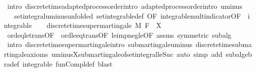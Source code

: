 \begin{isabellebody}
\ {\isacharparenleft}{\kern0pt}intro\ discrete{\isacharunderscore}{\kern0pt}time{\isacharunderscore}{\kern0pt}adapted{\isacharunderscore}{\kern0pt}process{\isacharunderscore}{\kern0pt}order{\isachardot}{\kern0pt}intro\ adapted{\isacharunderscore}{\kern0pt}process{\isacharunderscore}{\kern0pt}order{\isachardot}{\kern0pt}intro\ uminus{\isacharparenright}{\kern0pt}\isanewline
\ \ \isamarkupfalse%
\ {\isacharasterisk}{\kern0pt}\ {\isacharequal}{\kern0pt}\ set{\isacharunderscore}{\kern0pt}integral{\isacharunderscore}{\kern0pt}uminus{\isacharbrackleft}{\kern0pt}unfolded\ set{\isacharunderscore}{\kern0pt}integrable{\isacharunderscore}{\kern0pt}def{\isacharcomma}{\kern0pt}\ OF\ integrable{\isacharunderscore}{\kern0pt}mult{\isacharunderscore}{\kern0pt}indicator{\isacharbrackleft}{\kern0pt}OF\ {\isacharunderscore}{\kern0pt}\ integrable{\isacharbrackright}{\kern0pt}{\isacharbrackright}{\kern0pt}\isanewline
\ \ \isamarkupfalse%
\ {\isachardoublequoteopen}discrete{\isacharunderscore}{\kern0pt}time{\isacharunderscore}{\kern0pt}supermartingale\ M\ F\ {\isacharparenleft}{\kern0pt}{\isacharminus}{\kern0pt}{\isacharparenleft}{\kern0pt}{\isacharminus}{\kern0pt}\ X{\isacharparenright}{\kern0pt}{\isacharparenright}{\kern0pt}{\isachardoublequoteclose}\ \isamarkupfalse%
\ ord{\isacharunderscore}{\kern0pt}eq{\isacharunderscore}{\kern0pt}le{\isacharunderscore}{\kern0pt}trans{\isacharbrackleft}{\kern0pt}OF\ {\isacharasterisk}{\kern0pt}\ ord{\isacharunderscore}{\kern0pt}le{\isacharunderscore}{\kern0pt}eq{\isacharunderscore}{\kern0pt}trans{\isacharbrackleft}{\kern0pt}OF\ le{\isacharunderscore}{\kern0pt}imp{\isacharunderscore}{\kern0pt}neg{\isacharunderscore}{\kern0pt}le{\isacharbrackleft}{\kern0pt}OF\ assms{\isacharparenleft}{\kern0pt}{}{\isacharparenright}{\kern0pt}{\isacharbrackright}{\kern0pt}\ {\isacharasterisk}{\kern0pt}{\isacharbrackleft}{\kern0pt}symmetric{\isacharbrackright}{\kern0pt}{\isacharbrackright}{\kern0pt}{\isacharbrackright}{\kern0pt}\ subalg\isanewline
\ \ \ \ \isamarkupfalse%
\ {\isacharparenleft}{\kern0pt}intro\ discrete{\isacharunderscore}{\kern0pt}time{\isacharunderscore}{\kern0pt}supermartingale{\isachardot}{\kern0pt}intro\ submartingale{\isachardot}{\kern0pt}uminus\ discrete{\isacharunderscore}{\kern0pt}time{\isacharunderscore}{\kern0pt}submartingale{\isachardot}{\kern0pt}axioms\ uminus{\isacharunderscore}{\kern0pt}X{\isachardot}{\kern0pt}submartingale{\isacharunderscore}{\kern0pt}of{\isacharunderscore}{\kern0pt}set{\isacharunderscore}{\kern0pt}integral{\isacharunderscore}{\kern0pt}le{\isacharunderscore}{\kern0pt}Suc{\isacharparenright}{\kern0pt}\ {\isacharparenleft}{\kern0pt}auto\ simp\ add{\isacharcolon}{\kern0pt}\ subalgebra{\isacharunderscore}{\kern0pt}def\ integrable\ fun{\isacharunderscore}{\kern0pt}Compl{\isacharunderscore}{\kern0pt}def{\isacharcomma}{\kern0pt}\ blast{\isacharparenright}{\kern0pt}\isanewline

\end{isabellebody}
